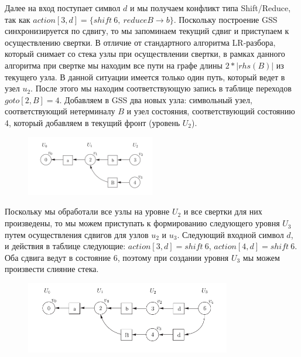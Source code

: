 Далее на вход поступает символ $d$ и мы получаем конфликт типа Shift/Reduce, так как $action[3, d] = \{shift\ 6,\ reduce B \rightarrow b\}$. Поскольку построение GSS синхронизируется по сдвигу, то мы запоминаем текущий сдвиг и приступаем к осуществлению свертки. В отличие от стандартного алгоритма LR-разбора, который снимает со стека узлы при осуществлении свертки, в рамках данного алгоритма при свертке мы находим все пути на графе длины $2 *|rhs(B)|$ из текущего узла. В данной ситуации имеется только один путь, который ведет в узел $u_2$. После этого мы находим соответствующую запись в таблице переходов $goto[2, B] = 4$. Добавляем в GSS два новых узла: символьный узел, соответствующий нетерминалу $B$ и узел состояния, соответствующий состоянию 4, который добавляем в текущий фронт (уровень $U_2$).
\begin{figure}[H]
\centering
\includegraphics[width=0.5\textwidth]{img/gss-step3.png}
\end{figure}

Поскольку мы обработали все узлы на уровне $U_2$ и все свертки для них произведены, то мы можем приступать к формированию следующего уровня $U_3$ путем осуществления сдвигов для узлов $u_2$ и $u_3$. Следующий входной символ $d$, и действия в таблице следующие: $action[3, d] = shift\ 6$, $action[4, d] = shift\ 6$. Оба сдвига ведут в состояние 6, поэтому при создании уровня $U_3$ мы можем произвести слияние стека.
\begin{figure}[H]
\centering
\includegraphics[width=0.8\textwidth]{img/gss-step4.png}
\end{figure}

